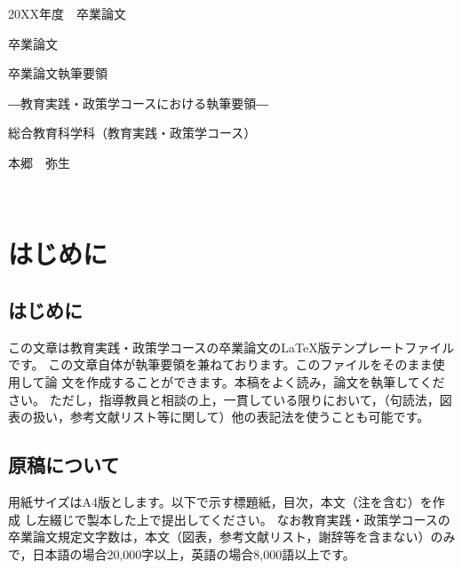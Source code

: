 \documentclass[a4paper,11pt,oneside,openany]{jsbook}
\begin{document}
\thispagestyle{empty}
20XX年度　卒業論文%
\bigskip%
\LARGE%
\begin{center}
卒業論文
\end{center}
\bigskip\bigskip\bigskip\bigskip\bigskip\bigskip\bigskip %
\begin{center} %
卒業論文執筆要領
\end{center}
\Large %
\begin{center}
―教育実践・政策学コースにおける執筆要領―
\end{center}
\bigskip\bigskip\bigskip\bigskip\bigskip\bigskip\bigskip\bigskip\bigskip\bigskip
\bigskip\bigskip\bigskip\bigskip\bigskip\bigskip\bigskip\bigskip\bigskip
\Large %
\begin{center}
 総合教育科学科（教育実践・政策学コース）
\end{center}
\LARGE %
\begin{center}
本郷　弥生
\end{center}
\normalsize
\newpage
\thispagestyle{empty}
　
\newpage
\setcounter{page}{0}

\thispagestyle{empty}
\tableofcontents
\newpage

\setcounter{page}{1}

\chapter{はじめに}
\thispagestyle{empty}

\section{はじめに}
この文章は教育実践・政策学コースの卒業論文の\LaTeX{}版テンプレートファイルです。
この文章自体が執筆要領を兼ねております。このファイルをそのまま使用して論
文を作成することができます。本稿をよく読み，論文を執筆してください。
ただし，指導教員と相談の上，一貫している限りにおいて，（句読法，図表の扱い，参考文献リスト等に関して）他の表記法を使うことも可能です。


\section{原稿について}
用紙サイズはA4版とします。以下で示す標題紙，目次，本文（注を含む）を作成
し左綴じで製本した上で提出してください。
なお教育実践・政策学コースの卒業論文規定文字数は，本文（図表，参考文献リスト，謝辞等を含まない）のみで，日本語の場合20,000字以上，英語の場合8,000語以上です。
\end{document}
